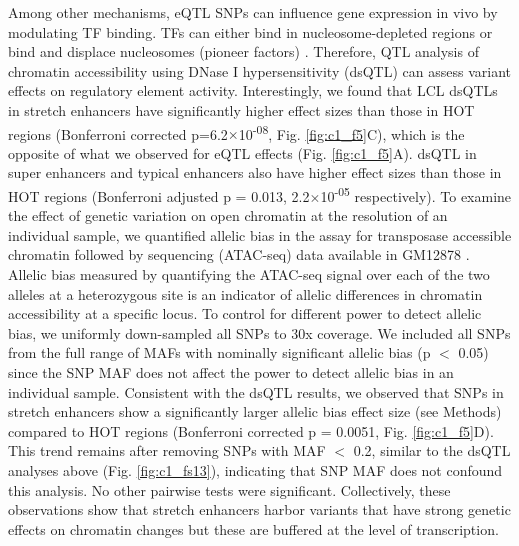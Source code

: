 Among other mechanisms, eQTL SNPs can influence gene expression in vivo by modulating TF binding. TFs can either bind in nucleosome-depleted regions or bind and displace nucleosomes (pioneer factors) \cite{grossNucleaseHypersensitiveSites1988, wangSequenceFeaturesChromatin2012, buenrostroTranspositionNativeChromatin2013}. Therefore, QTL analysis of chromatin accessibility using DNase I hypersensitivity (dsQTL) can assess variant effects on regulatory element activity. Interestingly, we found that LCL dsQTLs \cite{degnerDNaseSensitivityQTLs2012} in stretch enhancers have significantly higher effect sizes than those in HOT regions (Bonferroni corrected p=6.2$\times$10\textsuperscript{-08}, Fig. \ref{fig:c1_f5}C), which is the opposite of what we observed for eQTL effects (Fig. \ref{fig:c1_f5}A). dsQTL in super enhancers and typical enhancers also have higher effect sizes than those in HOT regions (Bonferroni adjusted p = 0.013, 2.2$\times$10\textsuperscript{-05} respectively). To examine the effect of genetic variation on open chromatin at the resolution of an individual sample, we quantified allelic bias in the assay for transposase accessible chromatin followed by sequencing (ATAC-seq) data available in GM12878 \cite{buenrostroTranspositionNativeChromatin2013}. Allelic bias measured by quantifying the ATAC-seq signal over each of the two alleles at a heterozygous site is an indicator of allelic differences in chromatin accessibility at a specific locus. To control for different power to detect allelic bias, we uniformly down-sampled all SNPs to 30x coverage. We included all SNPs from the full range of MAFs with nominally significant allelic bias (p $<$ 0.05) since the SNP MAF does not affect the power to detect allelic bias in an individual sample. Consistent with the dsQTL results, we observed that SNPs in stretch enhancers show a significantly larger allelic bias effect size (see Methods) compared to HOT regions (Bonferroni corrected p = 0.0051, Fig. \ref{fig:c1_f5}D). This trend remains after removing SNPs with MAF $<$ 0.2, similar to the dsQTL analyses above (Fig. \ref{fig:c1_fs13}), indicating that SNP MAF does not confound this analysis. No other pairwise tests were significant. Collectively, these observations show that stretch enhancers harbor variants that have strong genetic effects on chromatin changes but these are buffered at the level of transcription.

